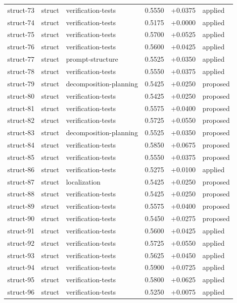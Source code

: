 \begin{center}
\begin{longtable}{llp{5.2cm}rrl}
struct-73 & struct & verification-tests & 0.5550 & +0.0375 & applied \\
struct-74 & struct & verification-tests & 0.5175 & +0.0000 & applied \\
struct-75 & struct & verification-tests & 0.5700 & +0.0525 & applied \\
struct-76 & struct & verification-tests & 0.5600 & +0.0425 & applied \\
struct-77 & struct & prompt-structure & 0.5525 & +0.0350 & applied \\
struct-78 & struct & verification-tests & 0.5550 & +0.0375 & applied \\
struct-79 & struct & decomposition-planning & 0.5425 & +0.0250 & proposed \\
struct-80 & struct & verification-tests & 0.5425 & +0.0250 & proposed \\
struct-81 & struct & verification-tests & 0.5575 & +0.0400 & proposed \\
struct-82 & struct & verification-tests & 0.5725 & +0.0550 & proposed \\
struct-83 & struct & decomposition-planning & 0.5525 & +0.0350 & proposed \\
struct-84 & struct & verification-tests & 0.5850 & +0.0675 & proposed \\
struct-85 & struct & verification-tests & 0.5550 & +0.0375 & proposed \\
struct-86 & struct & verification-tests & 0.5275 & +0.0100 & applied \\
struct-87 & struct & localization & 0.5425 & +0.0250 & proposed \\
struct-88 & struct & verification-tests & 0.5425 & +0.0250 & proposed \\
struct-89 & struct & verification-tests & 0.5575 & +0.0400 & proposed \\
struct-90 & struct & verification-tests & 0.5450 & +0.0275 & proposed \\
struct-91 & struct & verification-tests & 0.5600 & +0.0425 & applied \\
struct-92 & struct & verification-tests & 0.5725 & +0.0550 & applied \\
struct-93 & struct & verification-tests & 0.5625 & +0.0450 & applied \\
struct-94 & struct & verification-tests & 0.5900 & +0.0725 & applied \\
struct-95 & struct & verification-tests & 0.5800 & +0.0625 & applied \\
struct-96 & struct & verification-tests & 0.5250 & +0.0075 & applied \\

\end{longtable}
\end{center}
